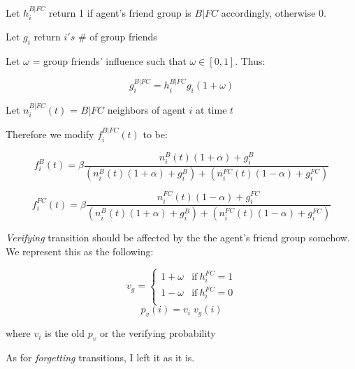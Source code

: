 \documentclass{article}
\begin{document}
\pagebreak
Let $h_i^{B|FC}$ return 1 if agent's friend group is $B|FC$ accordingly, otherwise 0.

Let $g_i$ return $i's$ \# of group friends

Let $\omega$ = group friends' influence such that $\omega \in [0,1]$. Thus:

\[g_i^{B|FC} = h_i^{B|FC}g_i(1+\omega)\]

Let $n_i^{B|FC}(t)$ = $B|FC$ neighbors of agent $i$ at time $t$

Therefore we modify $f_i^{B|FC}(t)$ to be:

\[f_i^B(t)=\beta\frac{n_i^B(t)(1+\alpha)+g_i^B}{(n_i^B(t)(1+\alpha)+g_i^B)+(n_i^{FC}(t)(1-\alpha)+g_i^{FC})}\]

\[f_i^{FC}(t)=\beta\frac{n_i^{FC}(t)(1-\alpha)+g_i^{FC}}{(n_i^B(t)(1+\alpha)+g_i^B)+(n_i^{FC}(t)(1-\alpha)+g_i^{FC})}\]

\textit{Verifying} transition should be affected by the
the agent's friend group somehow. We represent this as
the following:

\[ 
  v_g = 
  \begin{cases} 
      1+\omega & \text{if}\ h_i^{FC} = 1 \\
      1-\omega & \text{if}\ h_i^{FC} = 0 \\
  \end{cases}
\]
\[ p_v(i) = v_i\;v_g(i) \]

where $v_i$ is the old $p_v$ or the verifying probability

As for \textit{forgetting} transitions, I left it as it is.
%
%
%
%
%
\end{document}

